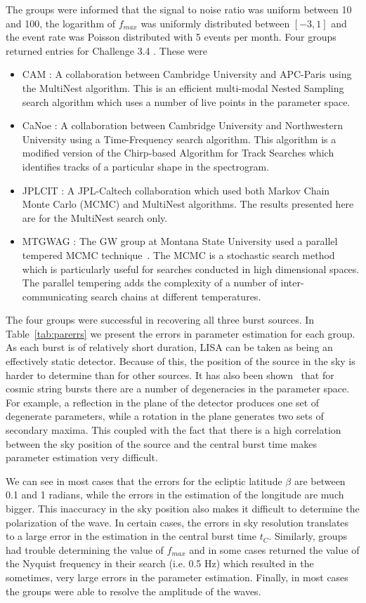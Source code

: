 \documentclass{iopart}
\begin{document}
The groups were informed that the signal to noise ratio was uniform between 10 and 100, the logarithm of $f_{max}$ was uniformly distributed between $[-3,1]$ and the event rate was Poisson distributed with 5 events per month.  Four groups returned entries for Challenge 3.4 .  These were
\begin{itemize}
\item CAM :  A collaboration between Cambridge University and APC-Paris using the MultiNest algorithm. This is an efficient multi-modal
Nested Sampling search algorithm which uses a number of live points in the parameter space.  
\item CaNoe : A collaboration between Cambridge University and Northwestern University using a Time-Frequency search algorithm. This algorithm is a modified
version of the Chirp-based Algorithm for Track Searches which identifies tracks of a particular shape in the spectrogram.
\item JPLCIT : A JPL-Caltech collaboration which used both Markov Chain Monte Carlo (MCMC) and MultiNest algorithms.  The results presented here are for 
the MultiNest search only.
\item MTGWAG : The GW group at Montana State University used a parallel tempered MCMC technique~\cite{keycornish}.  The MCMC is a stochastic search method which is particularly
useful for searches conducted in high dimensional spaces.  The parallel tempering adds the complexity of a number of inter-communicating search
chains at different temperatures.
\end{itemize}

The four groups were successful in recovering all three burst sources.  In Table~\ref{tab:parerrs} we present the errors in parameter estimation for each group.  As each burst is of relatively short duration, LISA can be taken as being an effectively static detector.  Because of this, the position of the source in the sky is harder to determine than for other sources.  It has also been shown~\cite{keycornish} that for cosmic string bursts there are a number of degeneracies in the parameter space.  For example, a reflection in the plane of the detector produces one set of degenerate parameters, while a rotation in the plane generates two sets of secondary maxima.  This coupled with the fact that there is a high correlation between the sky position of the source and the central burst time makes parameter estimation very difficult.  

We can see in most cases that the errors for the ecliptic latitude $\beta$ are between 0.1 and 1 radians, while the errors in the estimation of the longitude are much bigger.  This inaccuracy in the sky position also makes it difficult to determine the polarization of the wave.  In certain cases, the errors in sky resolution translates to a large error in the estimation in the central burst time $t_C$.   Similarly, groups had trouble determining the value of $f_{max}$ and in some cases returned the value of the Nyquist frequency in their search (i.e. 0.5 Hz) which resulted in the sometimes, very large errors in the parameter estimation. Finally, in most cases the groups were able to resolve the amplitude of the waves.
\end{document}
